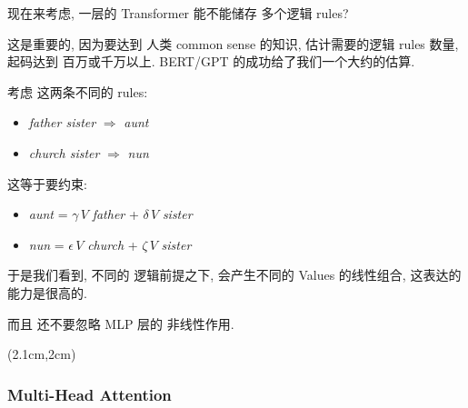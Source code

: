 \begin{preview}
\begin{minipage}{\textwidth}
现在来考虑, 一层的 Transformer 能不能储存 多个逻辑 rules?

这是重要的, 因为要达到 人类 common sense 的知识, 估计需要的逻辑 rules 数量, 起码达到 百万或千万以上.  BERT/GPT 的成功给了我们一个大约的估算.

考虑 这两条不同的 rules:
\begin{itemize}
	\item \textit{father sister} $\Rightarrow$ \textit{aunt}
	\item \textit{church sister} $\Rightarrow$ \textit{nun}
\end{itemize}
这等于要约束:
\begin{itemize}
	\item \textit{aunt} = $\gamma \, V$ \textit{father} + $\delta \, V$ \textit{sister}
	\item \textit{nun} = $\epsilon \, V$ \textit{church} + $\zeta \, V$ \textit{sister}
\end{itemize}
于是我们看到, 不同的 逻辑前提之下, 会产生不同的 Values 的线性组合, 这表达的能力是很高的.

而且 还不要忽略 MLP 层的 非线性作用.

\end{minipage}
\end{preview}

\begin{preview}
\begin{minipage}{\textwidth}

\setlength{\parskip}{0.4\baselineskip}
\begin{textblock*}{20cm}(2.1cm,2cm) %
	{}
	\hspace{8cm}
\end{textblock*}

\vspace*{0.3cm} 

\subsubsection{Multi-Head Attention}

\end{minipage}
\end{preview}

